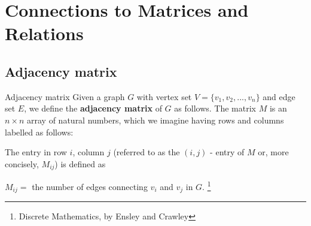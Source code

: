 
\newcommand{\laClass}       {CS 211}
\newcommand{\laSemester}    {Spring 2018}
\newcommand{\laChapter}     {7.4}
\newcommand{\laType}        {Exercise}
\newcommand{\laPoints}      {5}
\newcommand{\laTitle}       {Connections to Matrices and Relations}
\newcommand{\laDate}        {}
\setcounter{chapter}{7}
\setcounter{section}{4}
\addtocounter{section}{-1}

\toggletrue{answerkey}
\togglefalse{answerkey}





    \section{\laTitle}

    \subsection{Adjacency matrix}

        \begin{intro}{Adjacency matrix}
            Given a graph $G$ with vertex set $V = \{ v_{1}, v_{2}, ..., v_{n} \}$
            and edge set $E$, we define the \textbf{adjacency matrix} of $G$ as
            follows. The matrix $M$ is an $n \times n$ array of natural numbers,
            which we imagine having rows and columns labelled as follows:

            \begin{center}
            \end{center}


            The entry in row $i$, column $j$ (referred to as the $(i,j)$ - entry of $M$ or,
            more concisely, $M_{ij}$) is defined as

            \begin{center}
                $M_{ij} = $ the number of edges connecting $v_{i}$ and $v_{j}$ in $G$.
            \footnote{Discrete Mathematics, by Ensley and Crawley}
            \end{center}
        \end{intro}

